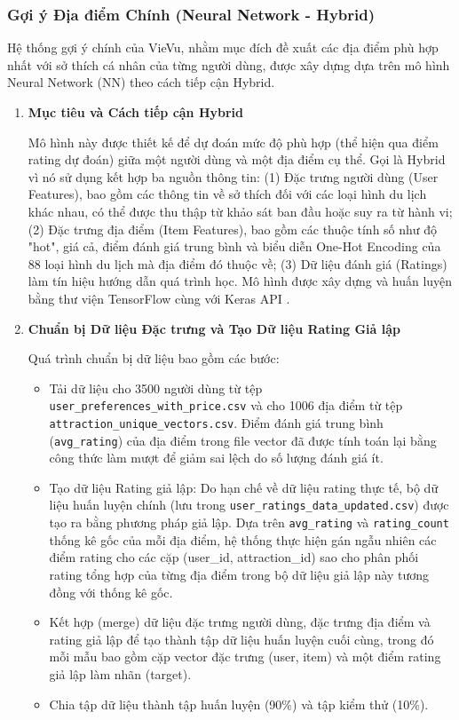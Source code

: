 \subsubsection{Gợi ý Địa điểm Chính (Neural Network - Hybrid)}
\label{subsubsec:nn_recsys_impl_final} %

Hệ thống gợi ý chính của VieVu, nhằm mục đích đề xuất các địa điểm phù hợp nhất với sở thích cá nhân của từng người dùng, được xây dựng dựa trên mô hình Neural Network (NN) theo cách tiếp cận Hybrid.
\begin{enumerate}
    \item \textbf{Mục tiêu và Cách tiếp cận Hybrid}
    
Mô hình này được thiết kế để dự đoán mức độ phù hợp (thể hiện qua điểm rating dự đoán) giữa một người dùng và một địa điểm cụ thể. Gọi là Hybrid vì nó sử dụng kết hợp ba nguồn thông tin: (1) Đặc trưng người dùng (User Features), bao gồm các thông tin về sở thích đối với các loại hình du lịch khác nhau, có thể được thu thập từ khảo sát ban đầu hoặc suy ra từ hành vi; (2) Đặc trưng địa điểm (Item Features), bao gồm các thuộc tính số như độ "hot", giá cả, điểm đánh giá trung bình và biểu diễn One-Hot Encoding của 88 loại hình du lịch mà địa điểm đó thuộc về; (3) Dữ liệu đánh giá (Ratings) làm tín hiệu hướng dẫn quá trình học. Mô hình được xây dựng và huấn luyện bằng thư viện TensorFlow cùng với Keras API \cite{tensorflow_lib, keras_lib}.
    
    \item \textbf{Chuẩn bị Dữ liệu Đặc trưng và Tạo Dữ liệu Rating Giả lập}

Quá trình chuẩn bị dữ liệu bao gồm các bước:
    \begin{itemize}
        \item Tải dữ liệu cho 3500 người dùng từ tệp \texttt{user\_preferences\_with\_price.csv} và cho 1006 địa điểm từ tệp \texttt{attraction\_unique\_vectors.csv}. Điểm đánh giá trung bình (\texttt{avg\_rating}) của địa điểm trong file vector đã được tính toán lại bằng công thức làm mượt để giảm sai lệch do số lượng đánh giá ít.
        \item Tạo dữ liệu Rating giả lập: Do hạn chế về dữ liệu rating thực tế, bộ dữ liệu huấn luyện chính (lưu trong \texttt{user\_ratings\_data\_updated.csv}) được tạo ra bằng phương pháp giả lập. Dựa trên \texttt{avg\_rating} và \texttt{rating\_count} thống kê gốc của mỗi địa điểm, hệ thống thực hiện gán ngẫu nhiên các điểm rating cho các cặp (user\_id, attraction\_id) sao cho phân phối rating tổng hợp của từng địa điểm trong bộ dữ liệu giả lập này tương đồng với thống kê gốc.
        \item Kết hợp (merge) dữ liệu đặc trưng người dùng, đặc trưng địa điểm và rating giả lập để tạo thành tập dữ liệu huấn luyện cuối cùng, trong đó mỗi mẫu bao gồm cặp vector đặc trưng (user, item) và một điểm rating giả lập làm nhãn (target).
        \item Chia tập dữ liệu thành tập huấn luyện (90\%) và tập kiểm thử (10\%).
    \end{itemize}
    

\end{enumerate}
